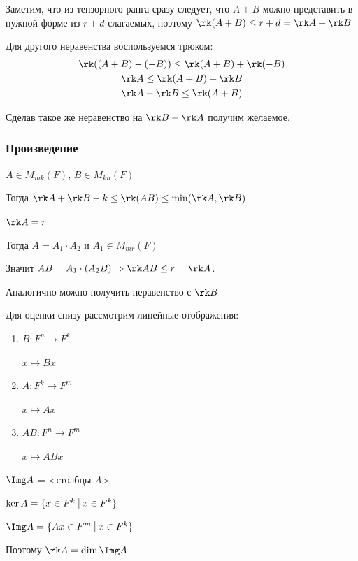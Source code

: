Заметим, что из тензорного ранга сразу следует, что \( A + B \) можно
представить в нужной форме из \( r + d \) слагаемых,
поэтому \( \rk (A + B) \leq r + d = \rk A + \rk B \)

Для другого неравенства воспользуемся трюком:
\begin{gather*}
    \rk ((A + B) - (-B)) \leq \rk (A + B) + \rk (-B)
    \\
    \rk A \leq \rk (A + B) + \rk B
    \\
    \rk A - \rk B \leq \rk (A + B)
\end{gather*}

Сделав такое же неравенство на \( \rk B - \rk A \) получим желаемое.

\subsubsection{Произведение}

\begin{lemma}{}{}
    \( A \in M_{mk} (F) \), \( B \in M_{kn} (F) \)

    Тогда \( \rk A + \rk B - k \leq \rk (AB) \leq \min (\rk A, \rk B) \)
\end{lemma}

\( \rk A = r \)

Тогда \( A = A_1 \cdot A_2 \) и \( A_1 \in M_{mr} (F) \)

Значит \( AB = A_1 \cdot (A_2 B) \Rightarrow \rk AB \leq r = \rk A \).

Аналогично можно получить неравенство с \( \rk B \)

Для оценки снизу рассмотрим линейные отображения:
\begin{enumerate}
    \item
        \( B: F^n \to F^k \)

        \( x \mapsto Bx \)
    \item
        \( A: F^k \to F^m \)

        \( x \mapsto Ax \)
    \item
        \( AB: F^n \to F^m \)

        \( x \mapsto ABx \)
\end{enumerate}

\( \Img A \) = <столбцы \( A \)>

\( \ker A = \{ x \in F^k \ \vline \ x \in F^k \} \)

\( \Img A = \{ Ax \in F^m \ \vline \ x \in F^k \} \)

Поэтому \( \rk A = \dim \Img A \)

